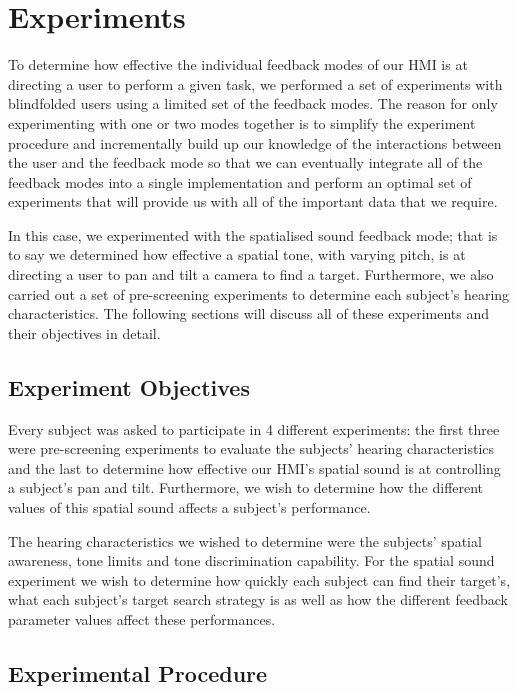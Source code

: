 \documentclass[format=sigconf, review=true, screen=true, anonymous=true]{acmart}
\begin{document}
\section{Experiments}

To determine how effective the individual feedback modes of our HMI is at directing a user to perform a given task, we performed a set of experiments with blindfolded users using a limited set of the feedback modes. The reason for only experimenting with one or two modes together is to simplify the experiment procedure and incrementally build up our knowledge of the interactions between the user and the feedback mode so that we can eventually integrate all of the feedback modes into a single implementation and perform an optimal set of experiments that will provide us with all of the important data that we require. 

In this case, we experimented with the spatialised sound feedback mode; that is to say we determined how effective a spatial tone, with varying pitch, is at directing a user to pan and tilt a camera to find a target. Furthermore, we also carried out a set of pre-screening experiments to determine each subject's hearing characteristics. The following sections will discuss all of these experiments and their objectives in detail. 

\subsection{Experiment Objectives}

Every subject was asked to participate in 4 different experiments: the first three were pre-screening experiments to evaluate the subjects' hearing characteristics and the last to determine how effective our HMI's spatial sound is at controlling a subject's pan and tilt. Furthermore, we wish to determine how the different values of this spatial sound affects a subject's performance. 

The hearing characteristics we wished to determine were the subjects' spatial awareness, tone limits and tone discrimination capability. For the spatial sound experiment we wish to determine how quickly each subject can find their target's, what each subject's target search strategy is as well as how the different feedback parameter values affect these performances. 

\subsection{Experimental Procedure}
\end{document}
